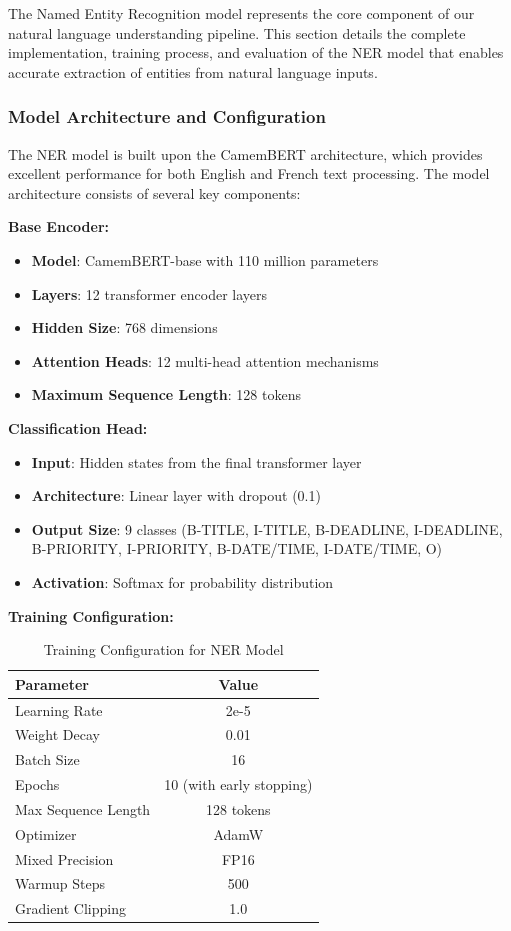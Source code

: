 \documentclass[12pt,a4paper]{article}
\begin{document}
The Named Entity Recognition model represents the core component of our natural language understanding pipeline. This section details the complete implementation, training process, and evaluation of the NER model that enables accurate extraction of entities from natural language inputs.

\subsubsection{Model Architecture and Configuration}

The NER model is built upon the CamemBERT architecture, which provides excellent performance for both English and French text processing. The model architecture consists of several key components:

\textbf{Base Encoder:}
\begin{itemize}
    \item \textbf{Model}: CamemBERT-base with 110 million parameters
    \item \textbf{Layers}: 12 transformer encoder layers
    \item \textbf{Hidden Size}: 768 dimensions
    \item \textbf{Attention Heads}: 12 multi-head attention mechanisms
    \item \textbf{Maximum Sequence Length}: 128 tokens
\end{itemize}

\textbf{Classification Head:}
\begin{itemize}
    \item \textbf{Input}: Hidden states from the final transformer layer
    \item \textbf{Architecture}: Linear layer with dropout (0.1)
    \item \textbf{Output Size}: 9 classes (B-TITLE, I-TITLE, B-DEADLINE, I-DEADLINE, B-PRIORITY, I-PRIORITY, B-DATE/TIME, I-DATE/TIME, O)
    \item \textbf{Activation}: Softmax for probability distribution
\end{itemize}

\textbf{Training Configuration:}
\begin{table}[H]
\centering
\begin{tabular}{|l|c|}
\hline
\textbf{Parameter} & \textbf{Value} \\
\hline
Learning Rate & 2e-5 \\
\hline
Weight Decay & 0.01 \\
\hline
Batch Size & 16 \\
\hline
Epochs & 10 (with early stopping) \\
\hline
Max Sequence Length & 128 tokens \\
\hline
Optimizer & AdamW \\
\hline
Mixed Precision & FP16 \\
\hline
Warmup Steps & 500 \\
\hline
Gradient Clipping & 1.0 \\
\hline
\end{tabular}
\caption{Training Configuration for NER Model}
\end{table}
\end{document}

